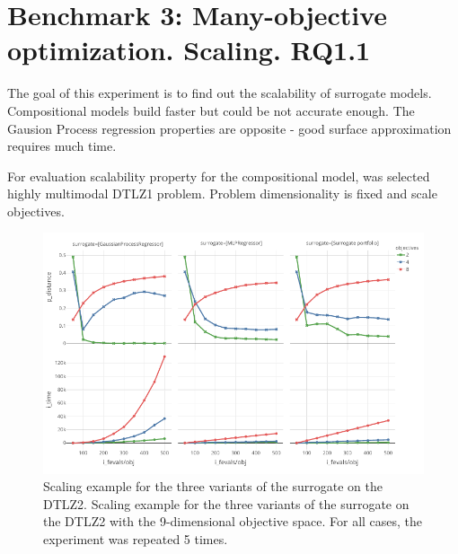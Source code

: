 \section{Benchmark 3: Many-objective optimization. Scaling. RQ1.1}

    The goal of this experiment is to find out the scalability of surrogate models. Compositional models build faster but could be not accurate enough. The Gausion Process regression properties are opposite - good surface approximation requires much time. 

    For evaluation scalability property for the compositional model, was selected highly multimodal DTLZ1 problem. Problem dimensionality is fixed and scale objectives.



    \begin{figure}
        \centering
        \includegraphics[width=\textwidth]{content/images/scale_dtlz2}
        \caption[Scaling example for the three variants of the surrogate on the DTLZ2.]{Scaling example for the three variants of the surrogate on the DTLZ2. Scaling example for the three variants of the surrogate on the DTLZ2  with the 9-dimensional objective space. For all cases, the experiment was repeated 5 times.}
        \label{fig:scale_dtlz2}    
    \end{figure}




